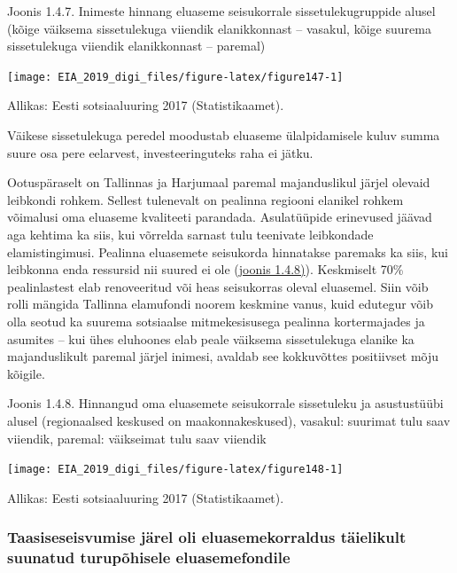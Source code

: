 \documentclass[estonian,]{article}
\begin{document}
{Joonis 1.4.7.} Inimeste hinnang eluaseme seisukorrale sissetulekugruppide alusel (kõige väiksema sissetulekuga viiendik elanikkonnast -- vasakul, kõige suurema sissetulekuga viiendik elanikkonnast -- paremal)

\begin{center}\texttt{[image: EIA\_2019\_digi\_files/figure-latex/figure147-1]} \end{center}

\begin{imgsource}
{Allikas:} Eesti sotsiaaluuring 2017 (Statistikaamet).
\end{imgsource}

\begin{blockquote-right}
Väikese sissetulekuga peredel moodustab eluaseme ülalpidamisele kuluv
summa suure osa pere eelarvest, investeeringuteks raha ei jätku.
\end{blockquote-right}

Ootuspäraselt on Tallinnas ja Harjumaal paremal majanduslikul järjel olevaid leibkondi rohkem. Sellest tulenevalt on pealinna regiooni elanikel rohkem võimalusi oma eluaseme kvaliteeti parandada. Asulatüüpide erinevused jäävad aga kehtima ka siis, kui võrrelda sarnast tulu teenivate leibkondade elamistingimusi. Pealinna eluasemete seisukorda hinnatakse paremaks ka siis, kui leibkonna enda ressursid nii suured ei ole (\protect\hyperlink{figure148}{joonis 1.4.8)}). Keskmiselt 70\% pealinlastest elab renoveeritud või heas seisukorras oleval eluasemel. Siin võib rolli mängida Tallinna elamufondi noorem keskmine vanus, kuid edutegur võib olla seotud ka suurema sotsiaalse mitmekesisusega pealinna kortermajades ja asumites -- kui ühes eluhoones elab peale väiksema sissetulekuga elanike ka majanduslikult paremal järjel inimesi, avaldab see kokkuvõttes positiivset mõju kõigile.

{Joonis 1.4.8.} Hinnangud oma eluasemete seisukorrale sissetuleku ja asustustüübi alusel (regionaalsed keskused on maakonnakeskused), vasakul: suurimat tulu saav viiendik, paremal: väikseimat tulu saav viiendik

\begin{center}\texttt{[image: EIA\_2019\_digi\_files/figure-latex/figure148-1]} \end{center}

\begin{imgsource}
{Allikas:} Eesti sotsiaaluuring 2017 (Statistikaamet).
\end{imgsource}

\hypertarget{taasiseseisvumise-juxe4rel-oli-eluasemekorraldus-tuxe4ielikult-suunatud-turupuxf5hisele-eluasemefondile}{%
\subsubsection*{Taasiseseisvumise järel oli eluasemekorraldus täielikult suunatud turupõhisele eluasemefondile}\label{taasiseseisvumise-juxe4rel-oli-eluasemekorraldus-tuxe4ielikult-suunatud-turupuxf5hisele-eluasemefondile}}
\end{document}
